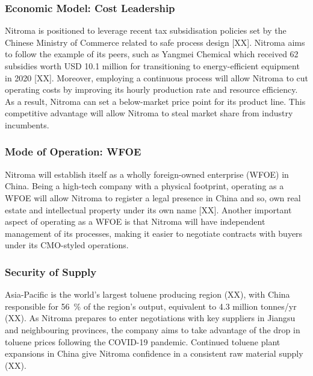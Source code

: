 \subsubsection{Economic Model: Cost Leadership}
Nitroma is positioned to leverage recent tax subsidisation policies set by the Chinese Ministry of Commerce related to safe process design [XX]. Nitroma aims to follow the example of its peers, such as Yangmei Chemical which received 62 subsidies worth USD 10.1 million for transitioning to energy-efficient equipment in 2020 [XX]. Moreover, employing a continuous process will allow Nitroma to cut operating costs by improving its hourly production rate and resource efficiency. As a result, Nitroma can set a below-market price point for its product line. This competitive advantage will allow Nitroma to steal market share from industry incumbents. 

\subsubsection{Mode of Operation: WFOE}
Nitroma will establish itself as a wholly foreign-owned enterprise (WFOE) in China. Being a high-tech company with a physical footprint, operating as a WFOE will allow Nitroma to register a legal presence in China and so, own real estate and intellectual property under its own name [XX]. Another important aspect of operating as a WFOE is that Nitroma will have independent management of its processes, making it easier to negotiate contracts with buyers under its CMO-styled operations.


\subsubsection{Security of Supply}
Asia-Pacific is the world's largest toluene producing region (XX), with China responsible for \SI{56}{\percent} of the region’s output, equivalent to 4.3 million tonnes/yr (XX). As Nitroma prepares to enter negotiations with key suppliers in Jiangsu and neighbouring provinces, the company aims to take advantage of the drop in toluene prices following the COVID-19 pandemic. Continued toluene plant expansions in China give Nitroma confidence in a consistent raw material supply (XX).

